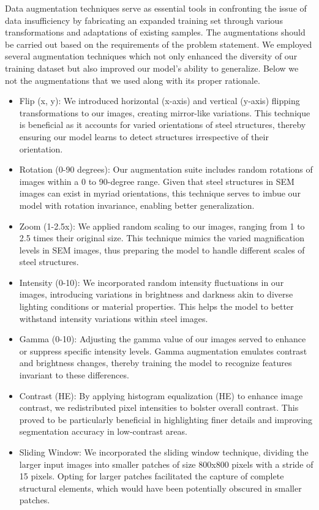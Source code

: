 \documentclass[]{article}
\begin{document}
Data augmentation techniques serve as essential tools in confronting the issue of data insufficiency by fabricating an expanded training set through various transformations and adaptations of existing samples. The augmentations should be carried out based on the requirements of the problem statement. We employed several augmentation techniques which not only enhanced the diversity of our training dataset but also improved our model's ability to generalize. Below we not the augmentations that we used along with its proper rationale.

\begin{itemize}
	\item Flip (x, y): We introduced horizontal (x-axis) and vertical (y-axis) flipping transformations to our images, creating mirror-like variations. This technique is beneficial as it accounts for varied orientations of steel structures, thereby ensuring our model learns to detect structures irrespective of their orientation.
	\item Rotation (0-90 degrees): Our augmentation suite includes random rotations of images within a 0 to 90-degree range. Given that steel structures in SEM images can exist in myriad orientations, this technique serves to imbue our model with rotation invariance, enabling better generalization.
	\item Zoom (1-2.5x): We applied random scaling to our images, ranging from 1 to 2.5 times their original size. This technique mimics the varied magnification levels in SEM images, thus preparing the model to handle different scales of steel structures.
	\item Intensity (0-10): We incorporated random intensity fluctuations in our images, introducing variations in brightness and darkness akin to diverse lighting conditions or material properties. This helps the model to better withstand intensity variations within steel images.
	\item Gamma (0-10): Adjusting the gamma value of our images served to enhance or suppress specific intensity levels. Gamma augmentation emulates contrast and brightness changes, thereby training the model to recognize features invariant to these differences.
	\item Contrast (HE): By applying histogram equalization (HE) to enhance image contrast, we redistributed pixel intensities to bolster overall contrast. This proved to be particularly beneficial in highlighting finer details and improving segmentation accuracy in low-contrast areas.
	\item Sliding Window: We incorporated the sliding window technique, dividing the larger input images into smaller patches of size 800x800 pixels with a stride of 15 pixels. Opting for larger patches facilitated the capture of complete structural elements, which would have been potentially obscured in smaller patches.
\end{itemize}
\end{document}
